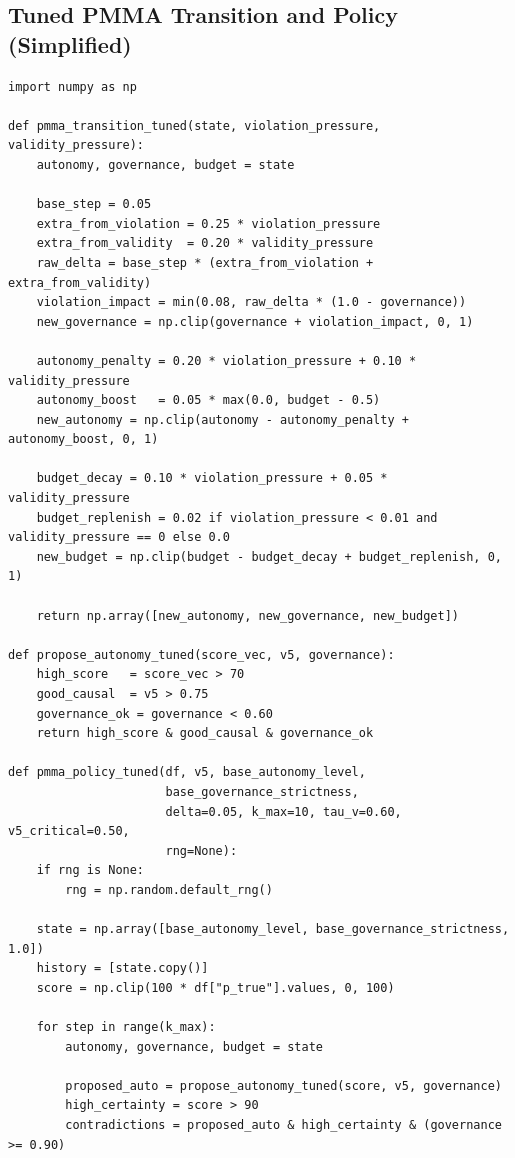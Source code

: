 \documentclass[11pt]{article}
\begin{document}
\subsection{Tuned PMMA Transition and Policy (Simplified)}

\begin{verbatim}
import numpy as np

def pmma_transition_tuned(state, violation_pressure, validity_pressure):
    autonomy, governance, budget = state

    base_step = 0.05
    extra_from_violation = 0.25 * violation_pressure
    extra_from_validity  = 0.20 * validity_pressure
    raw_delta = base_step * (extra_from_violation + extra_from_validity)
    violation_impact = min(0.08, raw_delta * (1.0 - governance))
    new_governance = np.clip(governance + violation_impact, 0, 1)

    autonomy_penalty = 0.20 * violation_pressure + 0.10 * validity_pressure
    autonomy_boost   = 0.05 * max(0.0, budget - 0.5)
    new_autonomy = np.clip(autonomy - autonomy_penalty + autonomy_boost, 0, 1)

    budget_decay = 0.10 * violation_pressure + 0.05 * validity_pressure
    budget_replenish = 0.02 if violation_pressure < 0.01 and validity_pressure == 0 else 0.0
    new_budget = np.clip(budget - budget_decay + budget_replenish, 0, 1)

    return np.array([new_autonomy, new_governance, new_budget])

def propose_autonomy_tuned(score_vec, v5, governance):
    high_score   = score_vec > 70
    good_causal  = v5 > 0.75
    governance_ok = governance < 0.60
    return high_score & good_causal & governance_ok

def pmma_policy_tuned(df, v5, base_autonomy_level,
                      base_governance_strictness,
                      delta=0.05, k_max=10, tau_v=0.60, v5_critical=0.50,
                      rng=None):
    if rng is None:
        rng = np.random.default_rng()

    state = np.array([base_autonomy_level, base_governance_strictness, 1.0])
    history = [state.copy()]
    score = np.clip(100 * df["p_true"].values, 0, 100)

    for step in range(k_max):
        autonomy, governance, budget = state

        proposed_auto = propose_autonomy_tuned(score, v5, governance)
        high_certainty = score > 90
        contradictions = proposed_auto & high_certainty & (governance >= 0.90)


\end{verbatim}
\end{document}
